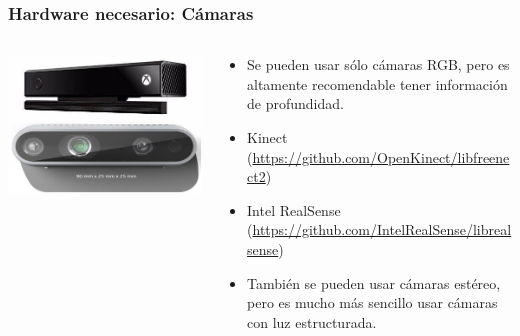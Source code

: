 \begin{frame}\frametitle{Hardware necesario: Cámaras}
  \begin{columns}
    \begin{column}{0.45\textwidth}
      \includegraphics[width=\textwidth]{Figures/Cameras.jpg}
    \end{column}
    \begin{column}{0.5\textwidth}
      \begin{itemize}
      \item Se pueden usar sólo cámaras RGB, pero es altamente recomendable tener información de profundidad.
      \item Kinect (\url{https://github.com/OpenKinect/libfreenect2})
      \item Intel RealSense (\url{https://github.com/IntelRealSense/librealsense})
      \item También se pueden usar cámaras estéreo, pero es mucho más sencillo usar cámaras con luz estructurada.
      \end{itemize}
    \end{column}
  \end{columns}
\end{frame}

